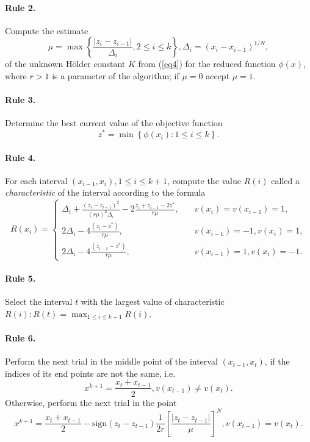 \documentclass[runningheads]{llncs}
\begin{document}
\paragraph{Rule 2.} Compute the estimate
\begin{equation}\label{eq7} 
\mu = \max\left\{ \frac{|z_i-z_{i-1}|}{\Delta _i}, 2 \leq i \leq k \right\} , \Delta _i= (x_i-x_{i-1})^{1/N},
\end{equation}
of the unknown H{\"o}lder constant $K$ from (\ref{eq4}) for the reduced function $\phi(x)$, where $r>1$ is a parameter of the algorithm; if $\mu=0$ accept $\mu=1$.
\paragraph{Rule 3.} Determine the best current value of the objective function
\begin{equation}\label{eq8} 
z^*=\min \left\{ \phi (x_i): 1\leq i \leq k \right\}.
\end{equation}

\paragraph{Rule 4.} For each interval $(x_{i-1},x_i),1 \leq i \leq k+1$, compute the value $R(i)$ called a \textit{characteristic} of the interval according to the formula
\begin{equation}\label{eq9} 
R(x_i)=
  \begin{cases}
    \Delta _i+\frac {{(z_i-z_{i-1})}^2}{{(r \mu)}^2 \Delta _i} - 2 \frac {z_i+z_{i-1}-2z^*}{r \mu}, & {\quad  v(x_i)=v(x_{i-1})=1},\\
    2 \Delta _i-4 \frac {(z_i-z^*)}{r \mu}, & {\quad  v(x_{i-1})=-1, v(x_i)=1},\\
    2 \Delta _i-4 \frac {(z_{i-1}-z^*)}{r \mu}, & {\quad  v(x_{i-1})=1, v(x_i)=-1.}
  \end{cases}
\end{equation}

\paragraph{Rule 5.} Select the interval $t$ with the largest value of characteristic $R(i):R(t)= \max_{1 \leq i \leq k+1} R(i)$.

\paragraph{Rule 6.} Perform the next trial in the middle point of the interval $(x_{t-1},x_t)$, if the indices of its end points are not the same, i.e.
\begin{equation}\label{eq10} 
x^{k+1}=\frac {x_t+x_{t-1}}{2}, v(x_{t-1})\neq v(x_t).
\end{equation}
Otherwise, perform the next trial in the point
\begin{equation}\label{eq11} 
x^{k+1}= \frac {x_t+x_{t-1}}{2} -  \text{sign} {(z_t-z_{t-1})} \frac{1}{2r} \left[\frac {{|z_t-z_{t-1}|}}{\mu} \right]^N, v(x_{t-1})=v(x_t).
\end{equation}
\end{document}
